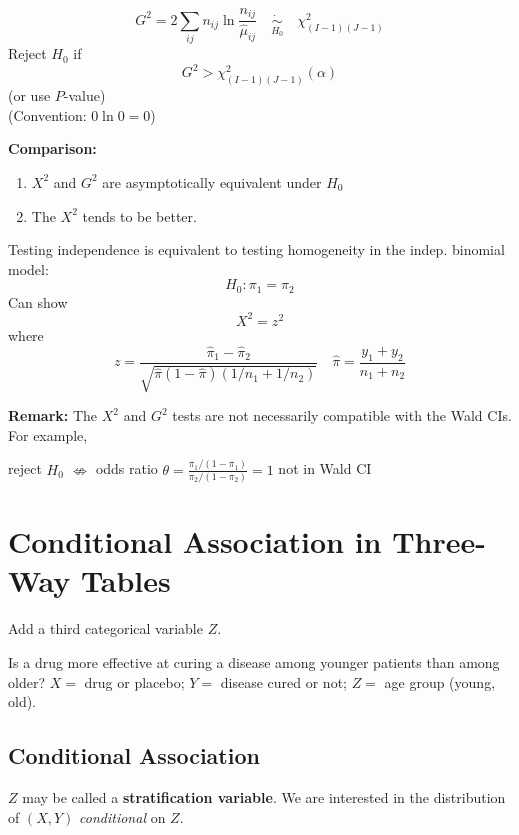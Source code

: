 \documentclass[11pt]{elegantbook}
\begin{document}
\begin{definition}
    $$G^2=2\sum_{i j}n_{ij} \ln \frac{n_{i j}}{\hat{\mu}_{i j}} \quad \underset{H_0}{\dot{\sim}}\quad \chi_{(I-1)(J-1)}^2$$
    Reject $H_0$ if
    $$G^2>\chi_{(I-1)(J-1)}^2(\alpha)$$
    (or use $P$-value)\\
    (Convention: $0 \ln 0 = 0$)
\end{definition}
\textbf{Comparison:}
\begin{enumerate}
    \item $X^2$ and $G^2$ are asymptotically equivalent under $H_0$
    \item The $X^2$ tends to be better.
\end{enumerate}
\begin{example}
    Testing independence is equivalent to testing homogeneity in the indep. binomial model:
    $$
    H_0: \pi_1=\pi_2
    $$
    Can show
    $$
    X^2=z^2
    $$
    where
    $$
    z=\frac{\hat{\pi}_1-\hat{\pi}_2}{\sqrt{\hat{\pi}(1-\hat{\pi})\left(1 / n_1+1 / n_2\right)}} \quad \hat{\pi}=\frac{y_1+y_2}{n_1+n_2}
    $$
\end{example}
\textbf{Remark:} The $X^2$ and $G^2$ tests are not necessarily compatible with the Wald CIs. For example,
\begin{center}
    reject $H_0$ $\nLeftrightarrow$  odds ratio $\theta =\frac{\pi_1/(1-\pi_1)}{\pi_2/(1-\pi_2)}= 1$ not in Wald CI
\end{center}





\section{Conditional Association in Three-Way Tables}
Add a third categorical variable $Z$.
\begin{example}
    Is a drug more effective at curing a disease among younger patients than among older?
    $X=$ drug or placebo; $Y=$ disease cured or not; $Z=$ age group (young, old).
\end{example}
\subsection{Conditional Association}
$Z$ may be called a \textbf{stratification variable}. We are interested in the distribution of $(X, Y)$ \textit{conditional} on $Z$.
\end{document}
